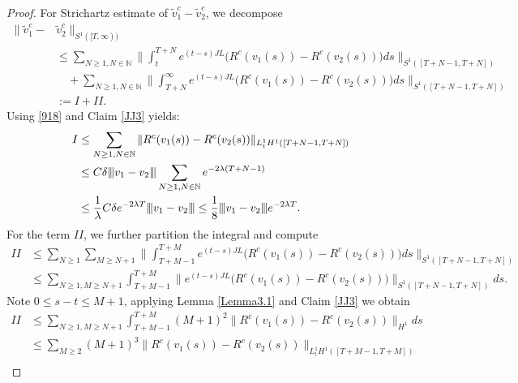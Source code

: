 \documentclass[12pt]{amsart}
\newcommand{\vertiii}[1]{{\left\vert\kern-0.25ex\left\vert\kern-0.25ex\left\vert #1 
    \right\vert\kern-0.25ex\right\vert\kern-0.25ex\right\vert}}
\begin{document}
\begin{proof}
For Strichartz estimate of $\tilde v_1^c-\tilde v_2^c$, we decompose
\begin{align*}
	\|\tilde v_1^c-&\tilde v_2^c\|_{ S^1([T,\infty))}\\
	&\le \sum_{
		N\ge 1, N\in\mathbb N
		} \biggl\|\int_t^{T +N}e^{(t-s)JL} \bigl(R^c(v_1(s))-R^c(v_2(s))\bigr)ds\biggr\|_{ S^1([T+ N-1, T+ N])}  \\
	&\quad +\sum_{
		N\ge 1, N\in\mathbb N
		} \biggl\|\int_{T+N}^{\infty} e^{(t-s)JL}\bigl(R^c(v_1(s))-R^c(v_2(s))\bigr)ds\biggr\|_{S^1([T+N-1, T+ N])} \\
	&:= I + II.
\end{align*}
Using \eqref{918} and Claim \ref{JJ3} yields: 
\begin{align*}
	I &\le \sum_{
		N\ge 1, N\in\mathbb N} 
		\|R^c(v_1(s))-R^c(v_2(s))\|_{L_t^1 H^1([T+N-1, T+N])} \\
	&\le C\delta\vertiii{v_1-v_2} \sum_{
		N\ge 1, N\in\mathbb N		} 
		 e^{-2\lambda (T+N-1)}\\
	& \le \frac 1{\lambda} C \delta  e^{-2\lambda T}\vertiii{v_1-v_2}\le \frac 18 \vertiii{v_1-v_2}e^{-2\lambda T}.
\end{align*}
For the term $II$, we further partition the integral and compute 
\begin{align*}
	II &\le \sum_{
		N\ge 1	}\sum_{
			 M\ge N+1
		 }\biggl \|\int_{T+M-1}^{T+M} e^{(t-s)JL} 
	     \bigl (R^c(v_1(s))-R^c(v_2(s))\bigr)ds\biggr\|_{ S^1([T+N-1, T+N])} \\
	   &\le \sum_{
			   N\ge 1,
			   M\ge N+1
               }\int_{T+M-1}^{T+M}\bigl \|e^{(t-s)JL}  \bigl (R^c(v_1(s))-R^c(v_2(s))\bigr)\bigr\|_{ S^1([T+N-1, T+N])}ds. 
\end{align*}
Note $0 \le s-t \le M+1$, applying Lemma \ref{Lemma3.1} and Claim \ref{JJ3} we obtain
\begin{align*}               
	   II&\le \sum_{
	N\ge 1, M\ge N+1        
	      }\int_{T+M-1}^{T+M} (M+1)^2\bigl \|R^c(v_1(s))-R^c(v_2(s))\bigr\|_{ H^1} ds\\
	   &\le \sum_{
			   M\ge2
                         }(M+1)^3 \|R^c(v_1(s))-R^c(v_2(s))\|_{L_t^1 H^1([T+M-1, T+M])} \\

\end{align*}
\end{proof}
\end{document}
